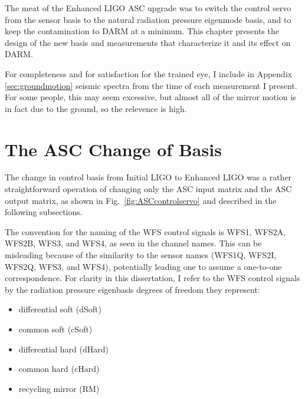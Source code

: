 The meat of the Enhanced LIGO ASC upgrade was to switch the control servo
from the sensor basis to the natural radiation pressure eigenmode
basis, and to keep the contamination to DARM at a minimum. This
chapter presents the design of the new basis and measurements that
characterize it and its effect on DARM. 

For completeness and for satisfaction for the trained eye, I include
in Appendix \ref{sec:groundmotion} seismic spectra from the time of
each measurement I present. For some people, this may seem excessive,
but almost all of the mirror motion is in fact due to the ground, so
the relevence is high.










\section{The ASC Change of Basis}
The change in control basis from Initial LIGO to Enhanced LIGO was a
rather straightforward operation of changing only the ASC input matrix
and the ASC output matrix, as shown in Fig.~\ref{fig:ASCcontrolservo} and
described in the following subsections.

The convention for the naming of the WFS control signals is WFS1,
WFS2A, WFS2B, WFS3, and WFS4, as seen in the channel names. This can
be misleading because of the similarity to the sensor names (WFS1Q,
WFS2I, WFS2Q, WFS3, and WFS4), potentially leading one to assume a
one-to-one correspondence. For clarity in this dissertation, I refer
to the WFS control signals by the radiation pressure eigenbasis
degrees of freedom they represent: 
\begin{itemize}
\item differential soft (dSoft) \\
\item common soft (cSoft) \\
\item differential hard (dHard) \\
\item common hard (cHard) \\
\item recycling mirror (RM)
\end{itemize}




